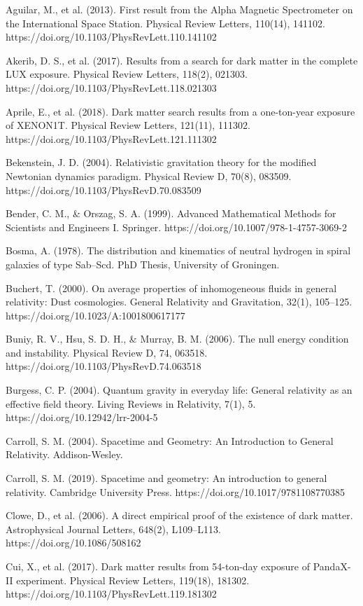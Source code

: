 \documentclass[11pt]{article}
\begin{document}
Aguilar, M., et al. (2013). First result from the Alpha Magnetic Spectrometer on the International Space Station. Physical Review Letters, 110(14), 141102. https://doi.org/10.1103/PhysRevLett.110.141102

Akerib, D. S., et al. (2017). Results from a search for dark matter in the complete LUX exposure. Physical Review Letters, 118(2), 021303. https://doi.org/10.1103/PhysRevLett.118.021303

Aprile, E., et al. (2018). Dark matter search results from a one-ton-year exposure of XENON1T. Physical Review Letters, 121(11), 111302. https://doi.org/10.1103/PhysRevLett.121.111302

Bekenstein, J. D. (2004). Relativistic gravitation theory for the modified Newtonian dynamics paradigm. Physical Review D, 70(8), 083509. https://doi.org/10.1103/PhysRevD.70.083509

Bender, C. M., \& Orszag, S. A. (1999). Advanced Mathematical Methods for Scientists and Engineers I. Springer. https://doi.org/10.1007/978-1-4757-3069-2

Bosma, A. (1978). The distribution and kinematics of neutral hydrogen in spiral galaxies of type Sab--Scd. PhD Thesis, University of Groningen.

Buchert, T. (2000). On average properties of inhomogeneous fluids in general relativity: Dust cosmologies. General Relativity and Gravitation, 32(1), 105--125. https://doi.org/10.1023/A:1001800617177

Buniy, R. V., Hsu, S. D. H., \& Murray, B. M. (2006). The null energy condition and instability. Physical Review D, 74, 063518. https://doi.org/10.1103/PhysRevD.74.063518

Burgess, C. P. (2004). Quantum gravity in everyday life: General relativity as an effective field theory. Living Reviews in Relativity, 7(1), 5. https://doi.org/10.12942/lrr-2004-5

Carroll, S. M. (2004). Spacetime and Geometry: An Introduction to General Relativity. Addison-Wesley.

Carroll, S. M. (2019). Spacetime and geometry: An introduction to general relativity. Cambridge University Press. https://doi.org/10.1017/9781108770385

Clowe, D., et al. (2006). A direct empirical proof of the existence of dark matter. Astrophysical Journal Letters, 648(2), L109--L113. https://doi.org/10.1086/508162

Cui, X., et al. (2017). Dark matter results from 54-ton-day exposure of PandaX-II experiment. Physical Review Letters, 119(18), 181302. https://doi.org/10.1103/PhysRevLett.119.181302
\end{document}
